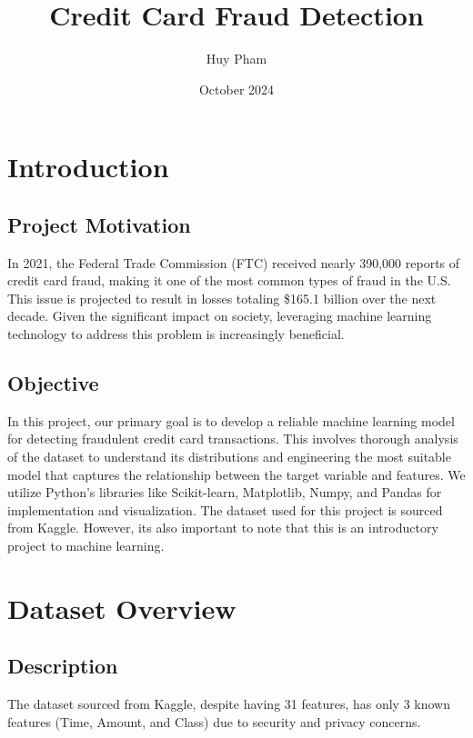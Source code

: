 \documentclass[12pt, letterpaper]{article}
\title{Credit Card Fraud Detection}
\author{Huy Pham}
\date{October 2024}
\begin{document}
\maketitle

\section{Introduction}
    \subsection{Project Motivation}
        In 2021, the Federal Trade Commission (FTC) received nearly 390,000 reports of credit card fraud, making it one of the most common types of fraud in the U.S. This issue is projected to result in losses totaling \$165.1 billion over the next decade. Given the significant impact on society, leveraging machine learning technology to address this problem is increasingly beneficial.

    \subsection{Objective}
        In this project, our primary goal is to develop a reliable machine learning model for detecting fraudulent credit card transactions. This involves thorough analysis of the dataset to understand its distributions and engineering the most suitable model that captures the relationship between the target variable and features. We utilize Python's libraries like Scikit-learn, Matplotlib, Numpy, and Pandas for implementation and visualization. The dataset used for this project is sourced from Kaggle. However, its also important to note that this is an introductory project to machine learning.
    
 
\section{Dataset Overview}
    \subsection{Description}
        The dataset sourced from Kaggle, despite having 31 features, has only 3 known features (Time, Amount, and Class) due to security and privacy concerns.  
\end{document}
